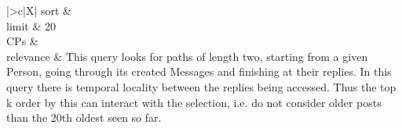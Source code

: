 \begin{tabularx}{\queryCardWidth}{|>{\queryPropertyCell}c|X|}
%
	sort		&
		\innerCardVSpace \\ \hline
	limit & 20 \\ \hline
	CPs &
	 \\ \hline
	relevance &
		\small This query looks for paths of length two, starting from a given Person, going through its created Messages and
finishing at their replies. In this query there is temporal locality between the replies being accessed. Thus the top k
order by this can interact with the selection, i.e. do not consider older posts than the 20th oldest seen so far.
 \\ \hline%
\end{tabularx}
\queryCardVSpace